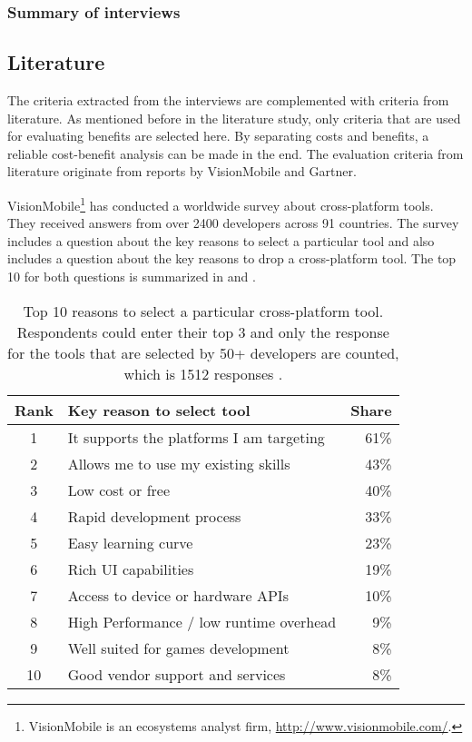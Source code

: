 \subsubsection*{Summary of interviews}


\subsection{Literature}

The criteria extracted from the interviews are complemented with criteria from literature. As mentioned before in the literature study, only criteria that are used for evaluating benefits are selected here. By separating costs and benefits, a reliable cost-benefit analysis can be made in the end. The evaluation criteria from literature originate from reports by VisionMobile and Gartner.

VisionMobile\footnote{VisionMobile is an ecosystems analyst firm, \url{http://www.visionmobile.com/}.} has conducted a worldwide survey about cross-platform tools. They received answers from over 2400 developers across 91 countries. The survey includes a question about the key reasons to select a particular tool and also includes a question about the key reasons to drop a cross-platform tool. The top 10 for both questions is summarized in  and .

\begin{table}[h]
    \begin{center}
        \begin{tabular}{clr}
            \hline
            Rank & Key reason to select tool & Share \\
            \hline
            1  & It supports the platforms I am targeting & 61\% \\
            2  & Allows me to use my existing skills & 43\% \\
            3  & Low cost or free & 40\% \\
            4  & Rapid development process & 33\% \\
            5  & Easy learning curve & 23\% \\
            6  & Rich UI capabilities & 19\% \\
            7  & Access to device or hardware APIs & 10\% \\
            8  & High Performance / low runtime overhead & 9\% \\
            9  & Well suited for games development & 8\% \\
            10 & Good vendor support and services & 8\% \\
            \hline
        \end{tabular}
        \caption{Top 10 reasons to select a particular cross-platform tool. Respondents could enter their top 3 and only the response for the tools that are selected by 50+ developers are counted, which is 1512 responses \cite{VMCPT:2012}.}
        \label{tab:select}
    \end{center}
\end{table}


